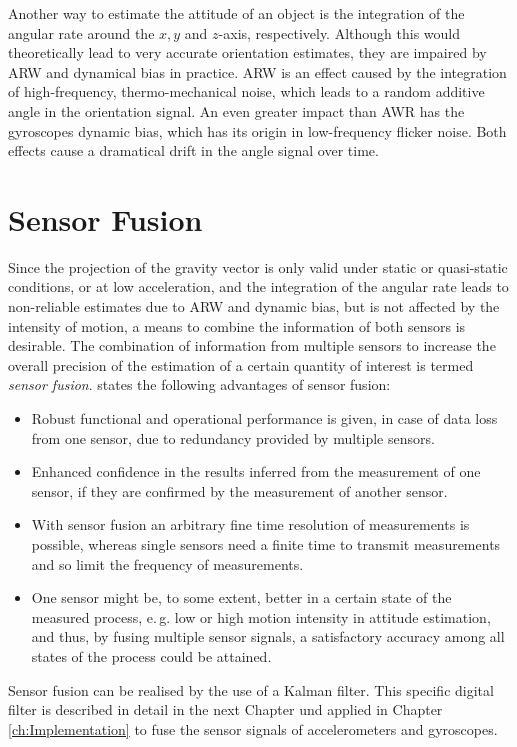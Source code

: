 Another way to estimate the attitude of an object is the integration of the angular rate around the $x, y$ and $z$-axis, respectively. Although this would theoretically lead to very accurate orientation estimates, they are impaired by \gls{ARW} and dynamical bias in practice. \gls{ARW} is an effect caused by the integration of high-frequency, thermo-mechanical noise, which leads to a random additive angle in the orientation signal. An even greater impact than AWR has the gyroscopes dynamic bias, which has its origin in low-frequency flicker noise. Both effects cause a dramatical drift in the angle signal over time.

\section{Sensor Fusion}

Since the projection of the gravity vector is only valid under static or quasi-static conditions, or at low acceleration, and the integration of the angular rate leads to non-reliable estimates due to \gls{ARW} and dynamic bias, but is not affected by the intensity of motion, a means to combine the information of both sensors is desirable. The combination of information from multiple sensors to increase the overall precision of the estimation of a certain quantity of interest is termed \emph{sensor fusion}. \citeauthor{raol2009multi} \cite{raol2009multi} states the following advantages of sensor fusion:
 
\begin{itemize}
\item Robust functional and operational performance is given, in case of data loss from one sensor, due to redundancy provided by multiple sensors.
\item Enhanced confidence in the results inferred from the measurement of one sensor, if they are confirmed by the measurement of another sensor.
\item With sensor fusion an arbitrary fine time resolution of measurements is possible, whereas single sensors need a finite time to transmit measurements and so limit the frequency of measurements.
\item One sensor might be, to some extent, better in a certain state of the measured process, e.\,g. low or high motion intensity in attitude estimation, and thus, by fusing multiple sensor signals, a satisfactory accuracy among all states of the process could be attained.
\end{itemize}

\noindent
Sensor fusion can be realised by the use of a Kalman filter. This specific digital filter is described in detail in the next Chapter und applied in Chapter \ref{ch:Implementation} to fuse the sensor signals of accelerometers and gyroscopes.


